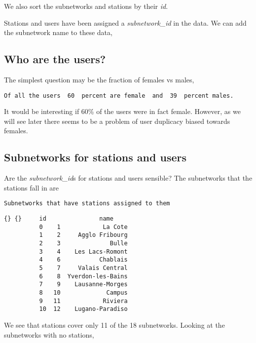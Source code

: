 \documentclass{report}
\begin{document}
    We also sort the subnetworks and stations by their \emph{id}.


    Stations and users have been assigned a \emph{subnetwork\_id} in the
data. We can add the subnetwork name to these data,


    \subsection{Who are the users?}\label{who-are-the-users}

The simplest question may be the fraction of females vs males,


    \begin{Verbatim}[commandchars=\\\{\}]
Of all the users  60  percent are female  and  39  percent males.
    \end{Verbatim}

    It would be interesting if 60\% of the users were in fact female.
However, as we will see later there seems to be a problem of user
duplicacy biased towards females.

    \subsection{Subnetworks for stations and
users}\label{subnetworks-for-stations-and-users}

Are the \emph{subnetwork\_id}s for stations and users sensible? The
subnetworks that the stations fall in are


    \begin{Verbatim}[commandchars=\\\{\}]
Subnetworks that have stations assigned to them
    \end{Verbatim}

            \begin{Verbatim}[commandchars=\\\{\}]
	{} {}     id               name
          0    1            La Cote
          1    2     Agglo Fribourg
          2    3              Bulle
          3    4    Les Lacs-Romont
          4    6           Chablais
          5    7     Valais Central
          6    8  Yverdon-les-Bains
          7    9    Lausanne-Morges
          8   10             Campus
          9   11            Riviera
          10  12    Lugano-Paradiso
\end{Verbatim}
        
    We see that stations cover only 11 of the 18 subnetworks. Looking at the
subnetworks with no stations,
\end{document}
